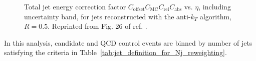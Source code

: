 \documentclass[dissertation.tex]{subfiles}
\begin{document}
\begin{figure}
	\caption{Total jet energy correction factor $C_{\mathrm{offset}}C_{\mathrm{MC}}C_{\mathrm{rel}}C_{\mathrm{abs}}$ vs. $\eta$, including uncertainty band, for jets reconstructed with the anti-$k_{T}$ algorithm, $R = 0.5$.  Reprinted from Fig. 26 of ref. \cite{CMS_JES_paper}.}
	\label{fig:total_JEC}
\end{figure}

In this analysis, candidate and QCD control events are binned by number of jets satisfying the criteria in Table~\ref{tab:jet_definition_for_Nj_reweighting}.
\end{document}
